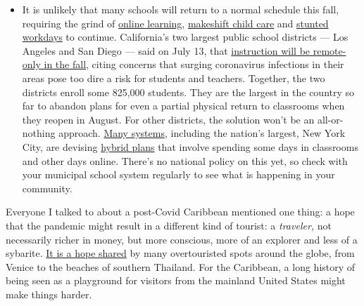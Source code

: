 \begin{itemize}
  \begin{itemize}
  \tightlist
  \item
    It is unlikely that many schools will return to a normal schedule
    this fall, requiring the grind of
    \href{https://www.nytimes.com/2020/06/05/us/coronavirus-education-lost-learning.html?action=click\&pgtype=Article\&state=default\&region=MAIN_CONTENT_3\&context=storylines_faq}{online
    learning},
    \href{https://www.nytimes.com/2020/05/29/us/coronavirus-child-care-centers.html?action=click\&pgtype=Article\&state=default\&region=MAIN_CONTENT_3\&context=storylines_faq}{makeshift
    child care} and
    \href{https://www.nytimes.com/2020/06/03/business/economy/coronavirus-working-women.html?action=click\&pgtype=Article\&state=default\&region=MAIN_CONTENT_3\&context=storylines_faq}{stunted
    workdays} to continue. California's two largest public school
    districts --- Los Angeles and San Diego --- said on July 13, that
    \href{https://www.nytimes.com/2020/07/13/us/lausd-san-diego-school-reopening.html?action=click\&pgtype=Article\&state=default\&region=MAIN_CONTENT_3\&context=storylines_faq}{instruction
    will be remote-only in the fall}, citing concerns that surging
    coronavirus infections in their areas pose too dire a risk for
    students and teachers. Together, the two districts enroll some
    825,000 students. They are the largest in the country so far to
    abandon plans for even a partial physical return to classrooms when
    they reopen in August. For other districts, the solution won't be an
    all-or-nothing approach.
    \href{https://bioethics.jhu.edu/research-and-outreach/projects/eschool-initiative/school-policy-tracker/}{Many
    systems}, including the nation's largest, New York City, are
    devising
    \href{https://www.nytimes.com/2020/06/26/us/coronavirus-schools-reopen-fall.html?action=click\&pgtype=Article\&state=default\&region=MAIN_CONTENT_3\&context=storylines_faq}{hybrid
    plans} that involve spending some days in classrooms and other days
    online. There's no national policy on this yet, so check with your
    municipal school system regularly to see what is happening in your
    community.
  \end{itemize}
\end{itemize}

Everyone I talked to about a post-Covid Caribbean mentioned one thing: a
hope that the pandemic might result in a different kind of tourist: a
\emph{traveler,} not necessarily richer in money, but more conscious,
more of an explorer and less of a sybarite.
\href{https://www.nytimes.com/2020/07/02/travel/venice-coronavirus-tourism.html}{It
is a hope shared} by many overtouristed spots around the globe, from
Venice to the beaches of southern Thailand. For the Caribbean, a long
history of being seen as a playground for visitors from the mainland
United States might make things harder.

